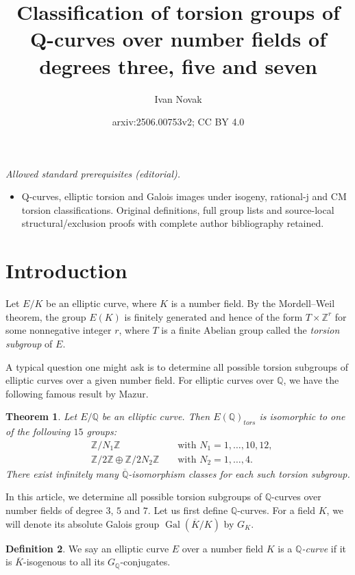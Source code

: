 \documentclass[10pt,leqno]{amsart}
\title{Classification of torsion groups of Q-curves over number fields of degrees three, five and seven}
\author{Ivan Novak}
\date{arxiv:2506.00753v2; CC BY 4.0}
\newcommand{\Z}{\mathbb{Z}}
\newcommand{\Q}{\mathbb{Q}}
\DeclareMathOperator{\Gal}{Gal}
\newtheorem{theorem}{Theorem}[]
\theoremstyle{definition}
\newtheorem{definition}[theorem]{Definition}
\theoremstyle{remark}
\numberwithin{theorem}{section}
\begin{document}
\maketitle
\noindent\textit{Allowed standard prerequisites (editorial).}\begin{itemize}
\item Q-curves, elliptic torsion and Galois images under isogeny, rational-j and CM torsion classifications. Original definitions, full group lists and source-local structural/exclusion proofs with complete author bibliography retained.
\end{itemize}\medskip
\section{Introduction}


\noindent
Let $E/K$ be an elliptic curve, where $K$ is a number field. By the Mordell--Weil theorem, the group $E(K)$ is finitely generated and hence of the form $T \times \mathbb Z^r$ for some nonnegative integer $r$, where $T$ is a finite Abelian group called the \emph{torsion subgroup} of $E$.

A typical question one might ask is to determine all possible torsion subgroups of elliptic curves over a given number field. For elliptic curves over $\Q$, we have the following famous result by Mazur.

\begin{theorem}\label{mazur}\cite{Mazur}
    Let $E/\Q$ be an elliptic curve. Then $E(\Q)_{tors}$ is isomorphic to one of the following $15$ groups:
   \begin{align*}
            &\Z/N_1\Z && \text{ with } N_1=1,\ldots,10,12, \\
            &\Z/2\Z\oplus \Z/2N_2\Z && \text{ with } N_2=1,\ldots, 4.
        \end{align*}
        There exist infinitely many $\overline{\Q}$-isomorphism classes for each such torsion subgroup.
\end{theorem}
In this article, we determine all possible torsion subgroups of $\Q$-curves over number fields of degree $3$, $5$ and $7$. Let us first define $\Q$-curves. For a field $K$, we will denote its absolute Galois group $\Gal(\overline K/K)$ by $G_K$.
\begin{definition}
We say an elliptic curve $E$ over a number field $K$ is a \emph{$\Q$-curve} if it is $\overline K$-isogenous to all its $G_\Q$-conjugates. 
\end{definition}
\end{document}
